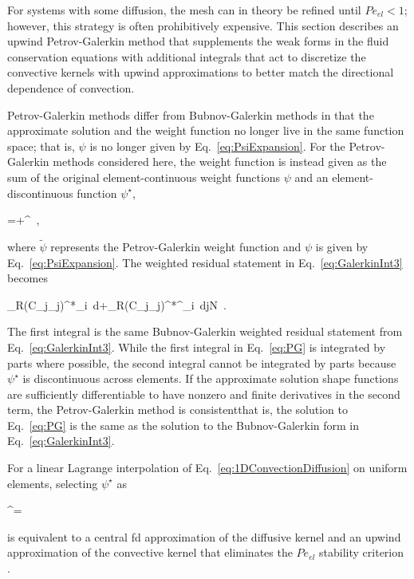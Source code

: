 For systems with some diffusion, the mesh can in theory be refined until \(Pe_{el}<1\); however, this strategy is often prohibitively expensive. This section describes an upwind Petrov-Galerkin method that supplements the weak forms in the fluid conservation equations with additional integrals that act to discretize the convective kernels with upwind approximations to better match the directional dependence of convection.

Petrov-Galerkin methods differ from Bubnov-Galerkin methods in that the approximate solution and the weight function no longer live in the same function space; that is, \(\psi\) is no longer given by Eq.\ \eqref{eq:PsiExpansion}. For the Petrov-Galerkin methods considered here, the weight function is instead given as the sum of the original element-continuous weight functions \(\psi\) and an element-discontinuous function \(\psi^\star\),

\beq
\label{eq:pgwf}
\tilde{\psi}=\psi+\psi^\star\ ,
\eeq

\noindent where \(\tilde{\psi}\) represents the Petrov-Galerkin weight function and \(\psi\) is given by Eq.\ \eqref{eq:PsiExpansion}. The weighted residual statement in Eq.\ \eqref{eq:GalerkinInt3} becomes

\beq
\label{eq:PG}
\int_{\Omega}\left\lbrack R\left(C_j\phi_j\right)\right\rbrack^*\phi_i\ d\Omega+\int_{\Omega}\left\lbrack R\left(C_j\phi_j\right)\right\rbrack^*\psi^\star_i\ d\hspace{1cm}j\in N\ .
\eeq

\noindent The first integral is the same Bubnov-Galerkin weighted residual statement from Eq.\ \eqref{eq:GalerkinInt3}. While the first integral in Eq.\ \eqref{eq:PG} is integrated by parts where possible, the second integral cannot be integrated by parts because \(\psi^\star\) is discontinuous across elements. If the approximate solution shape functions are sufficiently differentiable to have nonzero and finite derivatives in the second term, the Petrov-Galerkin method is consistent\mdash that is, the solution to Eq.\ \eqref{eq:PG} is the same as the solution to the Bubnov-Galerkin form in Eq.\ \eqref{eq:GalerkinInt3}.

For a linear Lagrange interpolation of Eq.\ \eqref{eq:1DConvectionDiffusion} on uniform elements, selecting \(\psi^\star\) as

\beq
\label{eq:psiStar}
\psi^\star=\cdot\nabla\psi\ 
\eeq

\noindent is equivalent to a central \gls{fd} approximation of the diffusive kernel and an upwind approximation of the convective kernel that eliminates the \(Pe_{el}\) stability criterion \cite{zienkiewicz,brooks,novak_manual_2020}. 

